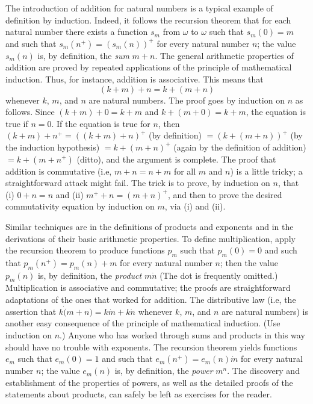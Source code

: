 
The introduction of addition for natural numbers is a typical example of definition by induction. Indeed, it follows the recursion theorem that for each natural number there exists a function $s_{m}$ from $\omega$ to $\omega$ such that $s_{m}(0) = m$ and such that $s_{m}(n^{+}) = (s_{m}(n))^{+}$ for every natural number $n$; the value $s_{m}(n)$ is, by definition, the \textit{sum} $m + n$. The general arithmetic properties of addition are proved by repeated applications of the principle of mathematical induction. Thus, for instance, addition is associative. This means that 
\begin{equation*}
(k + m) + n = k + (m + n) 
\end{equation*}
whenever $k$, $m$, and $n$ are natural numbers. The proof goes by induction on $n$ as follows. Since $(k + m) + 0 = k + m$ and $k + (m + 0) = k + m$, the equation is true if $n = 0$. If the equation is true for $n$, then $(k + m) + n^{+} = ((k+ m) + n)^{+}$ (by definition) $ = (k + (m + n))^{+}$ (by the induction hypothesis) $ = k + (m + n)^{+}$ (again by the definition of addition) $ = k + (m + n^{+})$ (ditto), and the argument is complete. The proof that addition is commutative (i.e, $m + n = n+ m$ for all $m$ and $n$) is a little tricky; a straightforward attack might fail. The trick is to prove, by induction on $n$, that (i) $0 + n = n$ and (ii) $m^{+} + n =  (m + n)^{+}$, and then to prove the desired commutativity equation by induction on $m$, via (i) and (ii). 

Similar techniques are in the definitions of products and exponents and in the derivations of their basic arithmetic properties. To define multiplication, apply the recursion theorem to produce functions $p_{m}$ such that $p_{m}(0) = 0$ and such that $p_{m}(n^{+}) = p_{m}(n) + m$ for every natural number $n$; then the value $p_{m}(n)$ is, by definition, the \textit{product} $m \dot n$ (The dot is frequently omitted.) Multiplication is associative and commutative; the proofs are straightforward adaptations of the ones that worked for addition. The distributive law (i.e, the assertion that $k \dot (m + n)  = k \dot m + k \dot n$ whenever $k$, $m$, and $n$ are natural numbers) is another easy consequence of the principle of mathematical induction. (Use induction on $n$.) Anyone who has worked through sums and products in this way should have no trouble with exponents. The recursion theorem yields functions $e_{m}$ such that $e_{m}(0) = 1$ and such that $e_{m}(n^{+}) = e_{m}(n) \dot m$ for every natural number $n$; the value $e_{m}(n)$ is, by definition, the \textit{power} $m^{n}$. The discovery and establishment of the properties of powers, as well as the detailed proofs of the statements about products, can safely be left as exercises for the reader.

